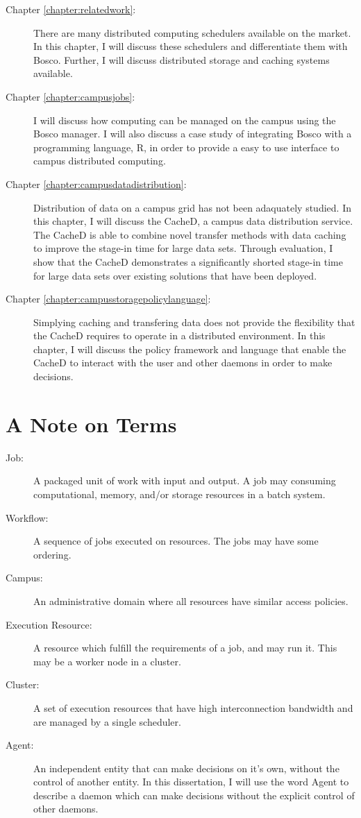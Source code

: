 \begin{description}
	\item[Chapter \ref{chapter:relatedwork}:]  There are many distributed computing schedulers available on the market.  In this chapter, I will discuss these schedulers and differentiate them with Bosco.  Further, I will discuss distributed storage and caching systems available.
	
	\item[Chapter \ref{chapter:campusjobs}:] I will discuss how computing can be managed on the campus using the Bosco manager.  I will also discuss a case study of integrating Bosco with a programming language, R, in order to provide a easy to use interface to campus distributed computing.
	
	\item[Chapter \ref{chapter:campusdatadistribution}:] Distribution of data on a campus grid has not been adaquately studied.  In this chapter, I will discuss the CacheD, a campus data distribution service.  The CacheD is able to combine novel transfer methods with data caching to improve the stage-in time for large data sets.  Through evaluation, I show that the CacheD demonstrates a significantly shorted stage-in time for large data sets over existing solutions that have been deployed.
	
	\item[Chapter \ref{chapter:campusstoragepolicylanguage}:]  
	Simplying caching and transfering data does not provide the flexibility that the CacheD requires to operate in a distributed environment.  In this chapter, I will discuss the policy framework and language that enable the CacheD to interact with the user and other daemons in order to make decisions.
\end{description}


\newpage
\section{A Note on Terms}

\begin{description}
	\item[Job:] A packaged unit of work with input and output.  A job may consuming computational, memory, and/or storage resources in a batch system.
	\item[Workflow:] A sequence of jobs executed on resources.  The jobs may have some ordering.
	\item[Campus:] An administrative domain where all resources have similar access policies.
	\item[Execution Resource:] A resource which fulfill the requirements of a job, and may run it.  This may be a worker node in a cluster.
	\item[Cluster:] A set of execution resources that have high interconnection bandwidth and are managed by a single scheduler.
	\item[Agent:] An independent entity that can make decisions on it's own, without the control of another entity.  In this dissertation, I will use the word Agent to describe a daemon which can make decisions without the explicit control of other daemons.
\end{description}



